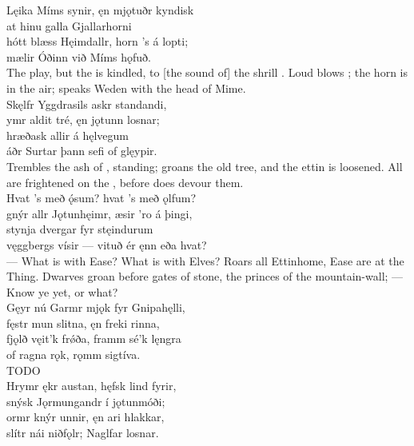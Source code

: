 \bva Lęika Míms synir, \hld ęn mjǫtuðr kyndisk \\%
at hinu galla \hld Gjallarhorni \\%
hótt blæss Hęimdallr, \hld horn ’s á lopti; \\%
mælir Óðinn \hld við Míms hǫfuð.\\%

\bvb The  play, but the  is kindled, to [the sound of] the shrill . Loud blows ; the horn is in the air; speaks Weden with the head of Mime.\\%

\bva Skęlfr Yggdrasils \hld askr standandi, \\%
ymr aldit tré, \hld ęn jǫtunn losnar; \\%
hræðask allir \hld á hęlvegum \\%
áðr Surtar þann \hld sefi of glęypir.\\%

\bvb Trembles the ash of , standing; groans the old tree, and the ettin is loosened. All are frightened on the , before  does devour them.\\%

\bva Hvat ’s með ǫ́sum? \hld hvat ’s með ǫlfum? \\%
gnýr allr Jǫtunhęimr, \hld æsir ’ro á þingi, \\%
stynja dvergar \hld fyr stęindurum \\%
vęggbergs vísir — \hld vituð ér ęnn eða hvat?\\%

\bvb — What is with Ease? What is with Elves? Roars all Ettinhome, Ease are at the Thing. Dwarves groan before gates of stone, the princes of the mountain-wall; — Know ye yet, or what?\\%

\bva Gęyr nú Garmr mjǫk \hld fyr Gnipahęlli, \\%
fęstr mun slitna, \hld ęn freki rinna, \\%
fjǫlð vęit’k frǿða, \hld framm sé’k lęngra \\%
of ragna rǫk, \hld rǫmm sigtíva.\\%

\bvb TODO\\%

\bva Hrymr ękr austan, \hld hęfsk lind fyrir, \\%
snýsk Jǫrmungandr \hld í jǫtunmóði; \\%
ormr knýr unnir, \hld ęn ari hlakkar, \\%
slítr nái niðfǫlr; \hld Naglfar losnar.\\%

